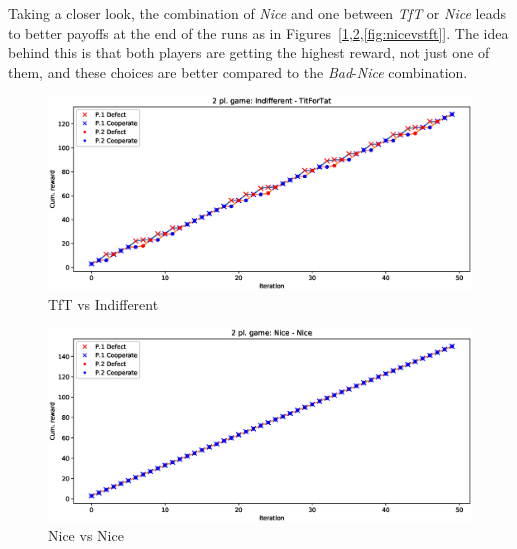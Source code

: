 \documentclass[journal,10pt,twoside]{IEEEtran}
\begin{document}
Taking a closer look, the combination of \textit{Nice} and one between \textit{TfT} or \textit{Nice} leads to better payoffs at the end of the runs as in Figures~[\ref{fig:tftvsindiff},\ref{fig:nicevsnice},\ref{fig:nicevstft}]. The idea behind this is that both players are getting the highest reward, not just one of them, and these choices are better compared to the \textit{Bad}-\textit{Nice} combination.

\begin{figure}[!ht]
    \centering
    \includegraphics[width=1\columnwidth]{../img/ipd2p/ipd2p-rewards-Indifferent-TitForTat}
    \caption{TfT vs Indifferent}
    \label{fig:tftvsindiff}
\end{figure}

\begin{figure}[!ht]
    \centering
    \includegraphics[width=1\columnwidth]{../img/ipd2p/ipd2p-rewards-Nice-Nice}
    \caption{Nice vs Nice}
    \label{fig:nicevsnice}
\end{figure}
\end{document}

